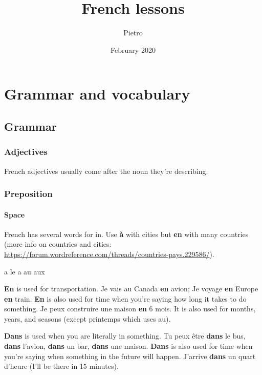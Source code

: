 \documentclass[a4paper,11pt,oneside]{book}
\title{French lessons}
\author{Pietro}
\date{February 2020}
\newcommand{\outref}[1]{\url{#1}}
\begin{document}
 
\frontmatter

\maketitle

\tableofcontents

\mainmatter

\chapter{Grammar and vocabulary}

\section{Grammar}

\subsection{Adjectives}

French adjectives usually come after the noun they’re describing.

\subsection{Preposition}

\subsubsection{Space}

French has several words for in.
Use \textbf{à} with cities but \textbf{en} with many countries
(more info on countries and cities: \outref{https://forum.wordreference.com/threads/countries-pays.229586/}).

a le
a au aux


\textbf{En} is used for transportation.
Je vais au Canada \textbf{en} avion; Je voyage \textbf{en} Europe \textbf{en} train.
\textbf{En} is also used for time when you're saying how long it takes to do something.
Je peux construire une maison \textbf{en} 6 mois.
It is also used for months, years, and seasons (except printemps which uses au).

\textbf{Dans} is used when you are literally in something.
Tu peux être \textbf{dans} le bus, \textbf{dans} l'avion, \textbf{dans} un bar, \textbf{dans} une maison.
\textbf{Dans} is also used for time when you're saying when something in the future will happen.
J'arrive \textbf{dans} un quart d'heure (I'll be there in 15 minutes).
\end{document}
